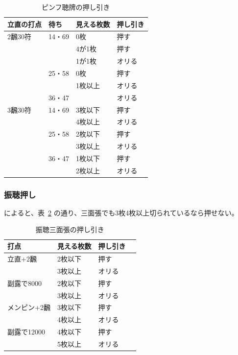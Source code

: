 \documentclass[../nankiru_main.tex]{subfiles}
\begin{document}
\begin{table}[h]
  \centering
  \begin{tabular}{llll}
    立直の打点 & 待ち & 見える枚数 & 押し引き \\
    \hline
    2飜30符 & 14・69 & 0枚    & 押す \\
           &        & 4が1枚 & 押す \\
           &        & 1が1枚 & オリる \\
           & 25・58 & 0枚    & 押す \\
           &        & 1枚以上 & オリる \\
           & 36・47 &        & オリる \\
    3飜30符 & 14・69 & 3枚以下 & 押す \\
           &        & 4枚以上 & オリる \\
           & 25・58 & 2枚以下 & 押す \\
           &        & 3枚以上 & オリる \\
           & 36・47 & 1枚以下 & 押す \\
           &        & 2枚以上 & オリる \\
  \end{tabular}
  \caption{ピンフ聴牌の押し引き\citep[][p.~30--31]{doi}}
  \label{tab:doi-pinfu-chase}
\end{table}


\subsubsection*{振聴押し}

\citet{doi}によると、表~\ref{tab:doi-furiten-chase} の通り、三面張でも3枚4枚以上切られているなら押せない。

\begin{table}[h]
  \centering
  \begin{tabular}{llll}
    打点 & 見える枚数 & 押し引き \\
    \hline
    立直+2飜 & 2枚以下 & 押す \\
     & 3枚以上 & オリる \\
    副露で8000 &  2枚以下 & 押す \\
     & 3枚以上 & オリる \\
    メンピン+2飜 & 3枚以下 & 押す \\
     & 4枚以上 & オリる \\
    副露で12000 & 4枚以下 & 押す \\
     & 5枚以上 & オリる
  \end{tabular}
  \caption{振聴三面張の押し引き\citep[][p.~72--75]{doi}}
  \label{tab:doi-furiten-chase}
\end{table}
\end{document}
